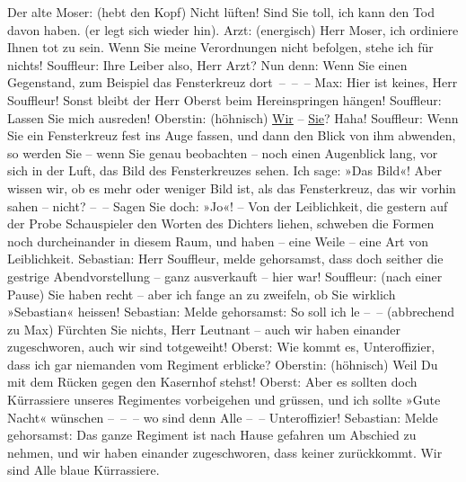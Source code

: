 \begin{ledgroupsized}[t]{13cm}
           \pstart
           Der alte Moser: (hebt den Kopf) Nicht lüften! Sind Sie toll, ich kann den Tod
					davon haben. (er legt sich wieder hin).\pend
           \pstart
           Arzt: (energisch) Herr Moser, ich ordiniere Ihnen tot zu sein. Wenn Sie meine
					Verordnungen nicht befolgen, stehe ich für nichts!\pend
           \pstart
           Souffleur: Ihre Leiber also, Herr Arzt? Nun denn: Wenn Sie einen Gegenstand, zum
					Beispiel das Fensterkreuz dort – – –\pend
           \pstart
           Max: Hier ist keines, Herr Souffleur! Sonst bleibt der Herr Oberst beim
					Hereinspringen hängen!\pend
           \pstart
           {\pb}Souffleur: Lassen Sie mich
					ausreden!\pend
           \pstart
           Oberstin: (höhnisch) \uline{Wir} – \uline{Sie}? Haha!\pend
           \pstart
           Souffleur: Wenn Sie ein Fensterkreuz fest ins Auge fassen, und dann den Blick von
					ihm abwenden, so werden Sie – wenn Sie genau beobachten – noch einen Augenblick
					lang, vor sich in der Luft, das Bild des Fensterkreuzes sehen. Ich sage: »Das
					Bild«! Aber wissen wir, ob es mehr oder weniger Bild ist, als das Fensterkreuz,
					das wir vorhin sahen – nicht? – – Sagen Sie doch: »Jo«! – Von der
					Leiblichkeit, die gestern auf der Probe Schauspieler den Worten des Dichters
					liehen, schweben die Formen noch durcheinander in diesem Raum, und haben – eine
					Weile – eine Art von Leiblichkeit.\pend
           \pstart
           Sebastian: Herr Souffleur, melde gehorsamst, dass doch seither die gestrige
					Abendvorstellung – ganz ausverkauft – hier war!\pend
           \pstart
           Souffleur: (nach einer Pause) Sie haben recht – aber ich fange an zu zweifeln, ob
					Sie wirklich »Sebastian« heissen!\pend
           \pstart
           Sebastian: Melde gehorsamst: So soll ich le – – (abbrechend zu Max) Fürchten
					Sie nichts, Herr Leutnant – auch wir haben einander zugeschworen, auch wir sind
					totgeweiht!\pend
           \pstart
           Oberst: Wie kommt es, Unteroffizier, dass ich gar niemanden vom Regiment
					erblicke?\pend
           \pstart
           Oberstin: (höhnisch) Weil Du mit dem Rücken gegen den Kasernhof stehst!\pend
           \pstart
           Oberst: Aber es sollten doch Kürrassiere unseres Regimentes vorbeigehen und
					grüssen, und ich sollte »Gute Nacht« wünschen – – – wo sind denn Alle
					– – Unteroffizier!\pend
           \pstart
           Sebastian: Melde gehorsamst: Das ganze Regiment ist nach Hause gefahren um
					Abschied zu nehmen, und wir haben einander {\pb}zugeschworen, dass keiner
					zurückkommt. Wir sind Alle blaue Kürrassiere.\pend

\end{ledgroupsized}
